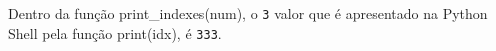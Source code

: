 \documentclass[12pt,varwidth=16cm,border=1pt]{standalone}
\begin{document}
Dentro da função print\_indexes(num), o \verb+3+ valor que é apresentado na Python Shell pela função print(idx), é \verb+333+.

\questiomfalse
\end{document}
